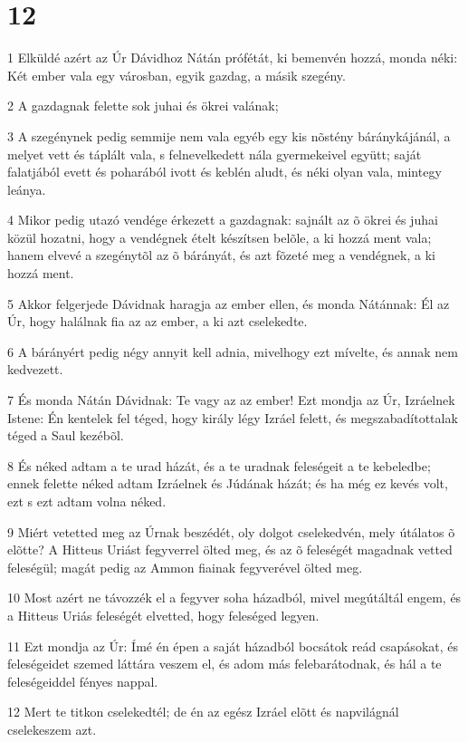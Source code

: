 \chapter{12}

\par 1 Elküldé azért az Úr Dávidhoz Nátán prófétát, ki bemenvén hozzá, monda néki: Két ember vala egy városban, egyik gazdag, a másik szegény.
\par 2 A gazdagnak felette sok juhai és ökrei valának;
\par 3 A szegénynek pedig semmije nem vala egyéb egy kis nõstény báránykájánál, a melyet vett és táplált vala, s felnevelkedett nála gyermekeivel együtt; saját falatjából evett és poharából ivott és keblén aludt, és néki olyan vala, mintegy leánya.
\par 4 Mikor pedig utazó vendége érkezett a gazdagnak: sajnált az õ ökrei és juhai közül hozatni, hogy a vendégnek ételt készítsen belõle, a ki hozzá ment vala; hanem elvevé a szegénytõl az õ bárányát, és azt fõzeté meg a vendégnek, a ki hozzá ment.
\par 5 Akkor felgerjede Dávidnak haragja az ember ellen, és monda Nátánnak: Él az Úr, hogy halálnak fia az az ember, a ki azt cselekedte.
\par 6 A bárányért pedig négy annyit kell adnia, mivelhogy ezt mívelte, és annak nem kedvezett.
\par 7 És monda Nátán Dávidnak: Te vagy az az ember! Ezt mondja az Úr, Izráelnek Istene: Én  kentelek fel téged, hogy király légy Izráel felett, és megszabadítottalak téged a Saul kezébõl.
\par 8 És néked adtam a te urad házát, és a te uradnak feleségeit a te kebeledbe; ennek felette néked adtam Izráelnek és Júdának házát; és ha még ez kevés volt, ezt s ezt adtam volna néked.
\par 9 Miért vetetted meg az Úrnak beszédét, oly dolgot cselekedvén, mely útálatos õ elõtte? A Hitteus Uriást fegyverrel  ölted meg, és az õ feleségét magadnak vetted feleségül; magát pedig az Ammon fiainak fegyverével ölted meg.
\par 10 Most azért ne távozzék el a fegyver soha házadból, mivel megútáltál engem,  és a Hitteus Uriás feleségét elvetted, hogy feleséged legyen.
\par 11 Ezt mondja az Úr: Ímé én épen a saját házadból bocsátok reád csapásokat, és feleségeidet szemed láttára veszem el, és adom más felebarátodnak, és hál a te feleségeiddel fényes nappal.
\par 12 Mert te titkon cselekedtél; de én az egész Izráel elõtt és napvilágnál cselekeszem azt.

